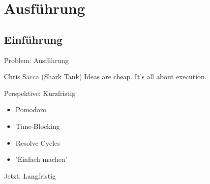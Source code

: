 \section{Ausführung}

\subsection{Einführung}


\begin{frame}[c]{Problem: Ausführung}
    \Large
    \begin{aquote}{Chris Sacca (Shark Tank)}
        Ideas are cheap. It's all about execution.
    \end{aquote}
\end{frame}


\begin{frame}[c]{Perspektive: Kurzfristig}
    \Large
    \begin{itemize}
        \item Pomodoro
        \item Time-Blocking
        \item Resolve Cycles
        \item 'Einfach machen'
    \end{itemize}
\end{frame}


\begin{frame}[standout]
    \Large
    Jetzt: Langfristig
\end{frame}

%
%
%
%
%


